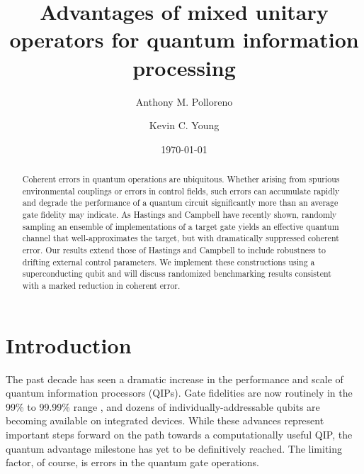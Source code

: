 \documentclass[aps,nofootinbib,pra,notitlepage,twocolumn]{revtex4-1}
\begin{document}
\title{Advantages of mixed unitary operators for quantum information processing}

\author{Anthony M. Polloreno}

\author{Kevin C. Young}

\date{\today}

\begin{abstract}
Coherent errors in quantum operations are ubiquitous. Whether arising from spurious environmental couplings or errors in control fields, such errors can accumulate rapidly and degrade the performance of a quantum circuit significantly more than an average gate fidelity may indicate. As Hastings and Campbell have recently shown, randomly sampling an ensemble of implementations of a target gate yields an effective quantum channel that well-approximates the target, but with dramatically suppressed coherent error. Our results extend those of Hastings and Campbell to include robustness to drifting external control parameters. We implement these constructions using a superconducting qubit and will discuss randomized benchmarking results consistent with a marked reduction in coherent error.
\end{abstract}

\pacs{}

\maketitle


\section{Introduction}
\label{sec:introduction}

The past decade has seen a dramatic increase in the performance and scale of quantum information processors (QIPs). Gate fidelities are now routinely in the 99\% to 99.99\% range \cite{Barends2014, Ballance2016}, and dozens of individually-addressable qubits are becoming available on integrated devices. While these advances represent important steps forward on the path towards a computationally useful QIP, the quantum advantage milestone \cite{1203.5813} has yet to be definitively reached. The limiting factor, of course, is errors in the quantum gate operations.
\end{document}
